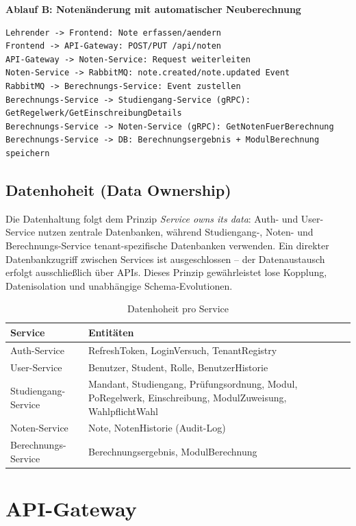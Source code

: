 \documentclass[12pt,a4paper,ngerman]{article}
\begin{document}
\textbf{Ablauf B: Notenänderung mit automatischer Neuberechnung}
\begin{lstlisting}
Lehrender -> Frontend: Note erfassen/aendern
Frontend -> API-Gateway: POST/PUT /api/noten
API-Gateway -> Noten-Service: Request weiterleiten
Noten-Service -> RabbitMQ: note.created/note.updated Event
RabbitMQ -> Berechnungs-Service: Event zustellen
Berechnungs-Service -> Studiengang-Service (gRPC): GetRegelwerk/GetEinschreibungDetails
Berechnungs-Service -> Noten-Service (gRPC): GetNotenFuerBerechnung
Berechnungs-Service -> DB: Berechnungsergebnis + ModulBerechnung speichern
\end{lstlisting}

\subsection{Datenhoheit (Data Ownership)}

Die Datenhaltung folgt dem Prinzip \textit{Service owns its data}: Auth- und User-Service nutzen zentrale Datenbanken, während Studiengang-, Noten- und Berechnungs-Service tenant-spezifische Datenbanken verwenden. Ein direkter Datenbankzugriff zwischen Services ist ausgeschlossen -- der Datenaustausch erfolgt ausschließlich über APIs. Dieses Prinzip gewährleistet lose Kopplung, Datenisolation und unabhängige Schema-Evolutionen.

\begin{table}[H]
\centering
\caption{Datenhoheit pro Service}
\begin{tabular}{lL{9cm}}
\toprule
\textbf{Service} & \textbf{Entitäten} \\
\midrule
Auth-Service        & RefreshToken, LoginVersuch, TenantRegistry \\
User-Service        & Benutzer, Student, Rolle, BenutzerHistorie \\
Studiengang-Service & Mandant, Studiengang, Prüfungsordnung, Modul, PoRegelwerk, Einschreibung, ModulZuweisung, WahlpflichtWahl \\
Noten-Service       & Note, NotenHistorie (Audit-Log) \\
Berechnungs-Service & Berechnungsergebnis, ModulBerechnung \\
\bottomrule
\end{tabular}
\end{table}

\section{API-Gateway}
\end{document}
